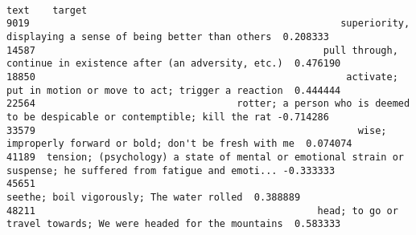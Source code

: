 \documentclass[a4paper,10pt,onecolumn,oneside,openright]{article}
\begin{document}
\begin{verbatim}
                                                                                                                 text    target
9019                                                      superiority, displaying a sense of being better than others  0.208333
14587                                                  pull through, continue in existence after (an adversity, etc.)  0.476190
18850                                                      activate; put in motion or move to act; trigger a reaction  0.444444
22564                                   rotter; a person who is deemed to be despicable or contemptible; kill the rat -0.714286
33579                                                        wise; improperly forward or bold; don't be fresh with me  0.074074
41189  tension; (psychology) a state of mental or emotional strain or suspense; he suffered from fatigue and emoti... -0.333333
45651                                                                       seethe; boil vigorously; The water rolled  0.388889
48211                                                 head; to go or travel towards; We were headed for the mountains  0.583333
\end{verbatim}
\end{document}
